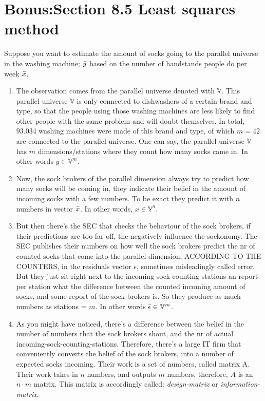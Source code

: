 \section{Bonus:Section 8.5 Least squares method}
Suppose you want to estimate the amount of socks going to the parallel universe in the washing machine; $\Bar{y}$ based on the number of handstands people do per week $\Bar{x}$. 
\begin{enumerate}
    \item The observation comes from the parallel universe denoted with $\mathbb{V}$. This parallel universe $\mathbb{V}$ is only connected to dishwashers of a certain brand and type, so that the people using those washing machines are less likely to find other people with the same problem and will doubt themselves. In total, 93.034 washing machines were made of this brand and type, of which $m=42$ are connected to the parallel universe. One can say, the parallel universe $\mathbb{V}$ has $m$ dimensions/stations where they count how many socks came in. In other words $y \in \mathbb{V}^m$.
    \item Now, the sock brokers of the parallel dimension always try to predict how many socks will be coming in, they indicate their belief in the amount of incoming socks with a few numbers. To be exact they predict it with $n$ numbers  in vector $\Bar{x}$. In other words, $x \in \mathbb{V}^n$.
    \item But then there's the SEC that checks the behaviour of the sock brokers, if their predictions are too far off, the negatively influence the sockonomy. The SEC publishes their numbers on how well the sock brokers predict the nr of counted socks that come into the parallel dimension, ACCORDING TO THE COUNTERS, in the residuals vector $\epsilon$, sometimes misleadingly called error. But they just sit right next to the incoming sock counting stations an report per station what the difference between the counted incoming amount of socks, and some report of the sock brokers is. So they produce as much numbers as stations = $m$. In other words $\Bar{\epsilon}\in\mathbb{V}^m$. 
    \item As you might have noticed, there's a difference between the belief in the number of numbers that the sock brokers shout, and the nr of actual incoming-sock-counting-stations. Therefore, there's a large IT firm that conveniently converts the belief of the sock brokers, into a number of expected socks incoming. Their work is a set of numbers, called matrix A. Their work takes in $n$ numbers, and outputs $m$ numbers, therefore, $A$ is an $n\cdot m$ matrix. This matrix is accordingly called: \textit{design-matrix} or \textit{information-matrix}.

\end{enumerate}
